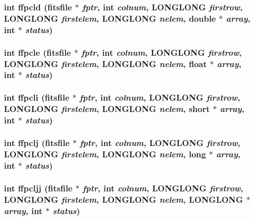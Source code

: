 \subsubsection{\setlength{\rightskip}{0pt plus 5cm}int ffpcld (\bf{fitsfile} $\ast$ {\em fptr}, int {\em colnum}, \bf{LONGLONG} {\em firstrow}, \bf{LONGLONG} {\em firstelem}, \bf{LONGLONG} {\em nelem}, double $\ast$ {\em array}, int $\ast$ {\em status})}\label{fitsio__64_8h_19edb8890772979f20c6f6e5957b2ad1}


\subsubsection{\setlength{\rightskip}{0pt plus 5cm}int ffpcle (\bf{fitsfile} $\ast$ {\em fptr}, int {\em colnum}, \bf{LONGLONG} {\em firstrow}, \bf{LONGLONG} {\em firstelem}, \bf{LONGLONG} {\em nelem}, float $\ast$ {\em array}, int $\ast$ {\em status})}\label{fitsio__64_8h_2af80b40c939d1d21b4da19e8999421c}


\subsubsection{\setlength{\rightskip}{0pt plus 5cm}int ffpcli (\bf{fitsfile} $\ast$ {\em fptr}, int {\em colnum}, \bf{LONGLONG} {\em firstrow}, \bf{LONGLONG} {\em firstelem}, \bf{LONGLONG} {\em nelem}, short $\ast$ {\em array}, int $\ast$ {\em status})}\label{fitsio__64_8h_097003985cb9d02ceced5a5744bfa0fc}


\subsubsection{\setlength{\rightskip}{0pt plus 5cm}int ffpclj (\bf{fitsfile} $\ast$ {\em fptr}, int {\em colnum}, \bf{LONGLONG} {\em firstrow}, \bf{LONGLONG} {\em firstelem}, \bf{LONGLONG} {\em nelem}, long $\ast$ {\em array}, int $\ast$ {\em status})}\label{fitsio__64_8h_5792d2cdff6869df24d96769d29588bb}


\subsubsection{\setlength{\rightskip}{0pt plus 5cm}int ffpcljj (\bf{fitsfile} $\ast$ {\em fptr}, int {\em colnum}, \bf{LONGLONG} {\em firstrow}, \bf{LONGLONG} {\em firstelem}, \bf{LONGLONG} {\em nelem}, \bf{LONGLONG} $\ast$ {\em array}, int $\ast$ {\em status})}\label{fitsio__64_8h_65ee3dc7c6f9893ec471ba73d3a9779d}


